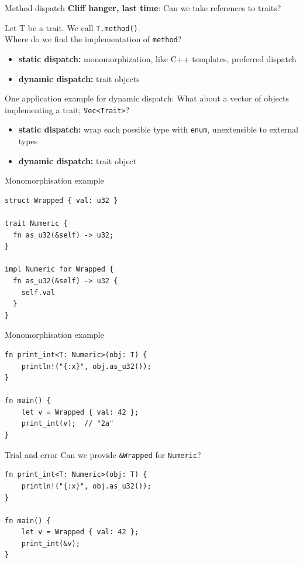 \documentclass{beamer}
\begin{document}
\begin{frame}[fragile]{Method dispatch}
  \textbf{Cliff hanger, last time}: Can we take references to traits?

  Let T be a trait. We call \texttt{T.method()}. \\
  Where do we find the implementation of \texttt{method}?
  \begin{itemize}
    \item \textbf{static dispatch:} monomorphization, like C++ templates, preferred dispatch
    \item \textbf{dynamic dispatch:} trait objects
  \end{itemize}

  One application example for dynamic dispatch: What about a vector of objects implementing a trait; \texttt{Vec<Trait>}?
  \begin{itemize}
    \item \textbf{static dispatch:} wrap each possible type with \texttt{enum}, unextensible to external types
    \item \textbf{dynamic dispatch:} trait object
  \end{itemize}
\end{frame}

\begin{frame}[fragile]{Monomorphisation example}
  \begin{verbatim}
struct Wrapped { val: u32 }

trait Numeric {
  fn as_u32(&self) -> u32;
}

impl Numeric for Wrapped {
  fn as_u32(&self) -> u32 {
    self.val
  }
}
\end{verbatim}
\end{frame}

\begin{frame}[fragile]{Monomorphisation example}
  \begin{verbatim}
fn print_int<T: Numeric>(obj: T) {
    println!("{:x}", obj.as_u32());
}

fn main() {
    let v = Wrapped { val: 42 };
    print_int(v);  // "2a"
}
\end{verbatim}
\end{frame}

\begin{frame}[fragile]{Trial and error}
  Can we provide \texttt{&Wrapped} for \texttt{Numeric}?
  \begin{verbatim}
fn print_int<T: Numeric>(obj: T) {
    println!("{:x}", obj.as_u32());
}

fn main() {
    let v = Wrapped { val: 42 };
    print_int(&v);
}
\end{verbatim}
\end{frame}
\end{document}
